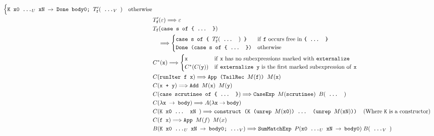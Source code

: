 \documentclass[sigplan,anonymous,review]{acmart}
\newcommand{\expr}[1]{(#1)} %
\newcommand{\rarr}{\rightarrow}
\newcommand{\rewrites}{\Longrightarrow}
\newcommand{\ttt}{\texttt}
\begin{document}
\begin{figure}[hp]
\begin{align*}
\begin{cases}
        \ttt{K x0 ...$_U$ xN $\rarr$ Done body0; $T'_{\ttt{f}}\expr{\ttt{ ...$_V$ }}$} & \text{otherwise}
      \end{cases}\\
  &T'_{\ttt{f}}\expr{\varepsilon} \rewrites \varepsilon\\
  &T_{\ttt{f}}\expr{\ttt{case s of \{ ... \}}}\\
    &\quad\rewrites
      \begin{cases}
        \ttt{case s of \{ $T'_{\ttt{f}}\expr{\ttt{ ... }}$ \}} & \text{if \ttt{f} occurs free in \ttt{\{ ... \}}}\\
        \ttt{Done (case s of \{ ... \})} & \text{otherwise}
      \end{cases}\\
  &C^{*}\expr{\ttt{x}} \rewrites
    \begin{cases}
      \ttt{x} & \text{if \ttt{x} has no subexpressions marked with \ttt{externalize}}\\
      C^{*}\expr{C\expr{\ttt{y}}} & \text{if \ttt{externalize y} is the first marked subexpression of \ttt{x}}\\
    \end{cases}\\
  &C\expr{\ttt{runIter f x}} \rewrites \ttt{App (TailRec $M\expr{\ttt{f}}$) $M\expr{\ttt{x}}$}\\
  &C\expr{\ttt{x + y}} \rewrites \ttt{Add $M\expr{\ttt{x}}$ $M\expr{\ttt{y}}$}\\
  &C\expr{\ttt{case scrutinee of \{ ... \}}} \rewrites \ttt{CaseExp $M\expr{\ttt{scrutinee}}$ } B\expr{\ttt{ ... }}\\
  &C\expr{\ttt{$\lambda$x $\rarr$ body}} \rewrites A\expr{\lambda \ttt{x} \rarr \ttt{body}}\\
  &C\expr{\ttt{K x0 ... xN }} \rewrites \ttt{construct (K (unrep $M\expr{\ttt{x0}}$) ... (unrep $M\expr{\ttt{xN}}$))}\;\;\;\;\text{(Where \ttt{K} is a constructor)}\\
  &C\expr{\ttt{f x}} \rewrites \ttt{App $M\expr{f}$ $M\expr{x}$}\\
  &B\expr{\ttt{K x0 ...$_U$ xN $\rarr$ body0; ...$_V$}} \rewrites \ttt{SumMatchExp }P\expr{\ttt{x0 ...$_U$ xN $\rarr$ body0}}\; B\expr{\ttt{ ...$_V$ }}\\

\end{align*}
\end{figure}
\end{document}
